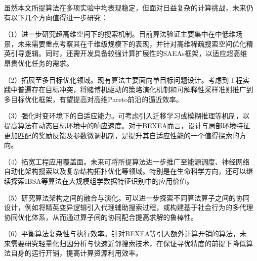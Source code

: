 虽然本文所提算法在多项实验中均表现稳定，但面对日益复杂的计算挑战，未来仍有以下几个方向值得进一步研究：

（1）进一步研究超高维空间下的搜索机制。目前算法验证主要集中在中低维场景，未来需要重点考察其在千维级规模下的表现，并针对高维稀疏搜索空间优化精英引导逻辑。同时，还需开发具备较强计算扩展性的SAEAs框架，以适应超高维昂贵优化任务的需求。

（2）拓展至多目标优化领域。现有算法主要面向单目标问题设计。考虑到工程实践中普遍存在目标冲突，将赌博机驱动的策略演化机制和可解释性采样准则推广到多目标优化框架，有望提高对高维Pareto前沿的逼近效率。

（3）强化时变环境下的自适应能力。可考虑引入迁移学习或模糊推理等机制，以提高算法在动态目标环境中的响应速度。对于BEXEA而言，设计与局部环境特征更加匹配的奖励反馈及参数微调机制，是提升其自适应性能的一个值得探索的方向。

（4）拓宽工程应用覆盖面。未来可将所提算法进一步推广至能源调度、神经网络自动化架构搜索以及复杂结构拓扑优化等领域。特别是在生命科学方向，还可以继续探索IBSA等算法在大规模组学数据特征识别中的应用价值。

（5）研究算法架构之间的融合与演化。可以进一步探索不同算法算子之间的协同设计，例如将精英变异逻辑引入代理辅助搜索过程，或构建基于社会行为的多代理协同优化体系，从而通过算子间的协同配合提高求解的鲁棒性。

（6）平衡算法复杂性与执行效率。针对BEXEA等引入额外计算开销的算法，未来需要研究轻量化归因分析与快速近邻搜索技术，在保证寻优精度的前提下降低算法自身的运行开销，提高计算资源利用效率。
